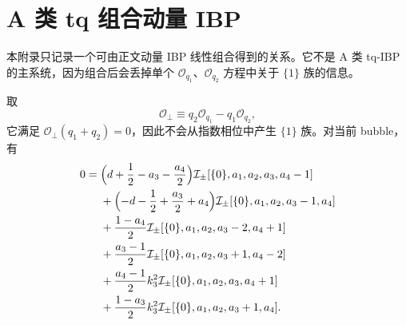 ﻿\documentclass[a4paper,11pt]{article}
\begin{document}
\section{A 类 tq 组合动量 IBP}
\label{app:tq-combined-momentum-ibp}

本附录只记录一个可由正文动量 IBP 线性组合得到的关系。它不是 A 类 tq-IBP 的主系统，因为组合后会丢掉单个 $\mathcal{O}_{q_1}$、$\mathcal{O}_{q_2}$ 方程中关于 $\{1\}$ 族的信息。

取
\begin{equation}
    \mathcal{O}_\perp\equiv q_2\mathcal{O}_{q_1}-q_1\mathcal{O}_{q_2},
\end{equation}
它满足 $\mathcal{O}_\perp(q_1+q_2)=0$，因此不会从指数相位中产生 $\{1\}$ 族。对当前 bubble，有
\begin{align}
    0={}&\Bigl(d+\frac12-a_3-\frac{a_4}{2}\Bigr)
        \mathcal{I}_{\pm}[\{0\},a_1,a_2,a_3,a_4-1]\notag\\
    &+\Bigl(-d-\frac12+\frac{a_3}{2}+a_4\Bigr)
        \mathcal{I}_{\pm}[\{0\},a_1,a_2,a_3-1,a_4]\notag\\
    &+\frac{1-a_4}{2}
        \mathcal{I}_{\pm}[\{0\},a_1,a_2,a_3-2,a_4+1]\notag\\
    &+\frac{a_3-1}{2}
        \mathcal{I}_{\pm}[\{0\},a_1,a_2,a_3+1,a_4-2]\notag\\
    &+\frac{a_4-1}{2}k_3^2
        \mathcal{I}_{\pm}[\{0\},a_1,a_2,a_3,a_4+1]\notag\\
    &+\frac{1-a_3}{2}k_3^2
        \mathcal{I}_{\pm}[\{0\},a_1,a_2,a_3+1,a_4].
\end{align}



\end{document}
